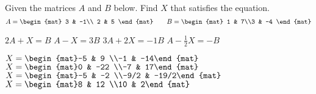 
\begin{Exercise}[
name={},
title={}, 
difficulty=0,
origin={\cite{GH}}]
Given the matrices $A$ and $B$ below. Find $X$ that satisfies the equation.
\begin{equation*}
A=\begin{mat}
3 & -1\\ 2 & 5
\end{mat}\qquad
B=\begin{mat}
1 & 7\\3 & -4
\end{mat}
\end{equation*}
\begin{multicols}{2}
\Question $2A + X = B$
\Question $A-X=3B$
\Question $3A + 2X = -1B$
\Question $A - \frac12X = -B$ 
\EndCurrentQuestion
\end{multicols}

\end{Exercise}

\begin{Answer}
\Question $X=\begin{mat}-5 & 9 \\-1 & -14\end{mat}$
\Question $X=\begin{mat}0 & -22 \\-7 & 17\end{mat}$
\Question $X=\begin{mat}-5 & -2 \\-9/2 & -19/2\end{mat}$
\Question $X=\begin{mat}8 & 12 \\10 & 2\end{mat}$
\end{Answer}
